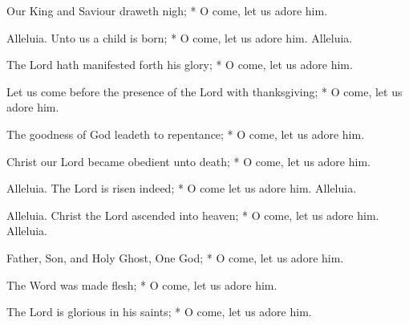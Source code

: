 \par\noindent
{} Our King and Saviour draweth nigh; * O come, let us adore him.
\par\noindent
{} Alleluia. Unto us a child is born; * O come, let us adore him. Alleluia.
\par\noindent
{} The Lord hath manifested forth his glory; * O come, let us adore him.
\par\noindent
 Let us come before the presence of the Lord with thanksgiving;  * O come, let us adore him.
\par\noindent
 The goodness of God leadeth to repentance; * O come, let us adore him.
\par\noindent
{} Christ our Lord became obedient unto death; * O come, let us adore him.
\par\noindent
{} Alleluia. The Lord is risen indeed; * O come let us adore him. Alleluia.
\par\noindent
{} Alleluia. Christ the Lord ascended into heaven; * O come, let us adore him. Alleluia.
\par\noindent
{} Father, Son, and Holy Ghost, One God; * O come, let us adore him.
\par\noindent
{} The Word was made flesh; * O come, let us adore him.
\par\noindent
 The Lord is glorious in his saints; * O come, let us adore him.

